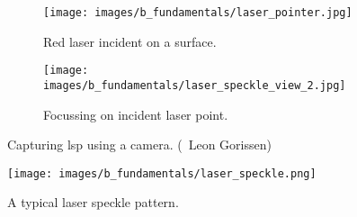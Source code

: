     \begin{figure}[h]
        \begin{subfigure}{0.5\textwidth}
            \centering
            \texttt{[image: images/b\_fundamentals/laser\_pointer.jpg]}
            \caption{Red laser incident on a surface.}
            \label{subfig:laser_pointer.jpg}
        \end{subfigure}
        \begin{subfigure}{0.5\textwidth}
            \centering
            \texttt{[image: images/b\_fundamentals/laser\_speckle\_view\_2.jpg]}
            \caption{Focussing on incident laser point.}
            \label{subfig:laser_speckle_view_2.jpg}
        \end{subfigure}
        \caption{Capturing \gls{lsp} using a camera. (\textcopyright \ Leon Gorissen) \cite{img_gorissen}}
        \label{fig:img_leon}
    \end{figure}
    
    \begin{figure}[h]
        \centering
        \texttt{[image: images/b\_fundamentals/laser\_speckle.png]}
        \caption{A typical laser speckle pattern.}
        \label{fig:laser_speckle.png}
    \end{figure}




    
